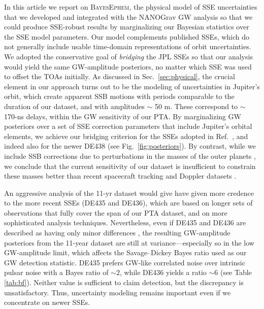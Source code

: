 \documentclass[reprint,
 amsmath,amssymb,
 aps,prd,floatfix,
]{revtex4-1}
\begin{document}
In this article we report on \textsc{BayesEphem}, the physical model of SSE uncertainties that we developed and integrated with the NANOGrav GW analysis so that we could produce SSE-robust results \cite{2018ApJ...859...47A} by marginalizing our Bayesian statistics over the SSE model parameters. 
Our model complements published SSEs, which do not generally include usable time-domain representations of orbit uncertainties.
We adopted the conservative goal of \emph{bridging} the JPL SSEs so that our analysis would yield the same GW-amplitude posteriors, no matter which SSE was used to offset the TOAs initially.
As discussed in Sec.\ \ref{sec:physical}, the crucial element in our approach turns out to be the modeling of uncertainties in Jupiter's orbit, which create apparent SSB motions with periods comparable to the duration of our dataset, and with amplitudes $\sim$ 50 m. These correspond to $\sim$ 170-ns delays, within the GW sensitivity of our PTA.
By marginalizing GW posteriors over a set of SSE correction parameters that include Jupiter's orbital elements, we achieve our bridging criterion for the SSEs adopted in Ref.\ \cite{2018ApJ...859...47A}, and indeed also for the newer DE438 \cite{de438} (see Fig.\ \ref{fig:posteriors}).
By contrast, while we include SSB corrections due to perturbations in the masses of the outer planets \cite{2010ApJ...720L.201C}, we conclude that the current sensitivity of our dataset is insufficient to constrain these masses better than recent spacecraft tracking and Doppler datasets \cite{jh+2000,2018MNRAS.481.5501C,2006AJ....132.2520J,2014AJ....148...76J,2009AJ....137.4322J}.

An aggressive analysis of the 11-yr dataset would give have given more credence to the more recent SSEs (DE435 and DE436), which are based on longer sets of observations that fully cover the span of our PTA dataset, and on more sophisticated analysis techniques.
Nevertheless, even if DE435 and DE436 are described as having only minor differences \cite{de435,de436}, the resulting GW-amplitude posteriors from the 11-year dataset are still at variance---especially so in the low GW-amplitude limit, which affects the Savage--Dickey Bayes ratio used as our GW detection statistic.
DE435 prefers GW-like correlated noise over intrinsic pulsar noise with a Bayes ratio of $\sim 2$, while DE436 yields a ratio $\sim 6$ (see Table \ref{tab:bf}). Neither value is sufficient to claim detection, but the discrepancy is unsatisfactory.
Thus, uncertainty modeling remains important even if we concentrate on newer SSEs.
\end{document}
